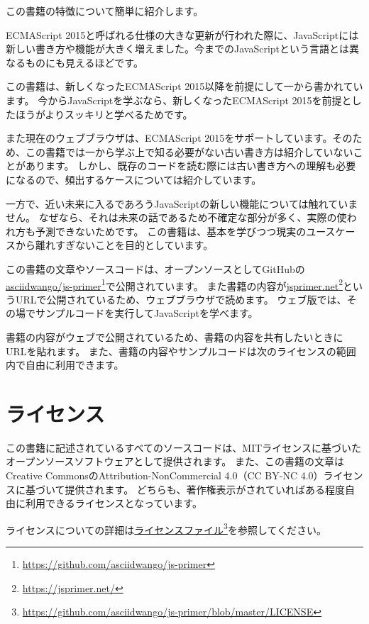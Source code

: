 この書籍の特徴について簡単に紹介します。

ECMAScript
2015と呼ばれる仕様の大きな更新が行われた際に、JavaScriptには新しい書き方や機能が大きく増えました。今までのJavaScriptという言語とは異なるものにも見えるほどです。

この書籍は、新しくなったECMAScript
2015以降を前提にして一から書かれています。
今からJavaScriptを学ぶなら、新しくなったECMAScript
2015を前提としたほうがよりスッキリと学べるためです。

また現在のウェブブラウザは、ECMAScript
2015をサポートしています。そのため、この書籍では一から学ぶ上で知る必要がない古い書き方は紹介していないことがあります。
しかし、既存のコードを読む際には古い書き方への理解も必要になるので、頻出するケースについては紹介しています。

一方で、近い未来に入るであろうJavaScriptの新しい機能については触れていません。
なぜなら、それは未来の話であるため不確定な部分が多く、実際の使われ方も予測できないためです。
この書籍は、基本を学びつつ現実のユースケースから離れすぎないことを目的としています。

この書籍の文章やソースコードは、オープンソースとしてGitHubの\href{https://github.com/asciidwango/js-primer}{asciidwango/js-primer}\footnote{\url{https://github.com/asciidwango/js-primer}}で公開されています。
また書籍の内容が\href{https://jsprimer.net/}{jsprimer.net}\footnote{\url{https://jsprimer.net/}}というURLで公開されているため、ウェブブラウザで読めます。
ウェブ版では、その場でサンプルコードを実行してJavaScriptを学べます。

書籍の内容がウェブで公開されているため、書籍の内容を共有したいときにURLを貼れます。
また、書籍の内容やサンプルコードは次のライセンスの範囲内で自由に利用できます。

\hypertarget{license}{%
\section*{ライセンス}\label{license}}

この書籍に記述されているすべてのソースコードは、MITライセンスに基づいたオープンソースソフトウェアとして提供されます。
また、この書籍の文章はCreative CommonsのAttribution-NonCommercial
4.0（CC BY-NC 4.0）ライセンスに基づいて提供されます。
どちらも、著作権表示がされていればある程度自由に利用できるライセンスとなっています。

ライセンスについての詳細は\href{https://github.com/asciidwango/js-primer/blob/master/LICENSE}{ライセンスファイル}\footnote{\url{https://github.com/asciidwango/js-primer/blob/master/LICENSE}}を参照してください。

